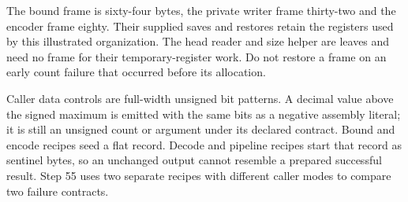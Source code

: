 The bound frame is sixty-four bytes, the private writer frame thirty-two and the
encoder frame eighty. Their supplied saves and restores retain the registers used
by this illustrated organization. The head reader and size helper are leaves and
need no frame for their temporary-register work. Do not restore a frame on an early
count failure that occurred before its allocation.

Caller data controls are full-width unsigned bit patterns. A decimal value above the
signed maximum is emitted with the same bits as a negative assembly literal; it is
still an unsigned count or argument under its declared contract. Bound and encode
recipes seed a flat record. Decode and pipeline recipes start that record as sentinel
bytes, so an unchanged output cannot resemble a prepared successful result. Step 55
uses two separate recipes with different caller modes to compare two failure contracts.
